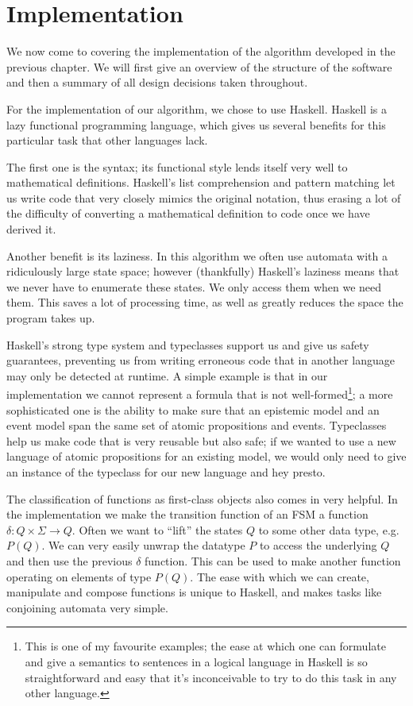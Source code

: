 \documentclass[10pt, a4paper]{report}
\begin{document}
\newpage 

\chapter{Implementation}

We now come to covering the implementation of the algorithm developed in the
previous chapter. We will first give an overview of the structure of the
software and then a summary of all design decisions taken throughout. 

For the implementation of our algorithm, we chose to use Haskell. Haskell is a
lazy functional programming language, which gives us several benefits for this
particular task that other languages lack. 

The first one is the syntax; its functional style lends itself very well to
mathematical definitions. Haskell's list comprehension and pattern matching let us
write code that very closely mimics the original notation, thus erasing a lot of
the difficulty of converting a mathematical definition to code once we have
derived it. 

Another benefit is its laziness. In this algorithm we often use automata
with a ridiculously large state space; however (thankfully) Haskell's laziness
means that we never have to enumerate these states. We only access them when we
need them. This saves a lot of processing time, as well as greatly reduces the
space the program takes up.

Haskell's strong type system and typeclasses support us and give us safety
guarantees, preventing us from writing erroneous code that in another language
may only be detected at runtime. A simple example is that in our implementation
we cannot represent a formula that is not well-formed\footnote{This is one of my
  favourite examples; the ease at which one can formulate and give a semantics
  to sentences in a logical language in Haskell is so straightforward and easy
  that it's inconceivable to try to do this task in any other language.}; a more
sophisticated one is the ability to make sure that an epistemic model and an
event model span the same set of atomic propositions and events. Typeclasses
help us make code that is very reusable but also safe; if we wanted to use a new
language of atomic propositions for an existing model, we would only need to
give an instance of the  typeclass for our new language and hey
presto.

The classification of functions as first-class objects also comes in very
helpful. In the implementation we make the transition function of an FSM a
function $\delta : Q \times \Sigma \rightarrow Q$. Often we want to ``lift'' the
states $Q$ to some other data type, e.g. $P (Q)$. We can very easily unwrap the
datatype $P$ to access the underlying $Q$ and then use the previous $\delta$
function. This can be used to make another function operating on elements of
type $P (Q)$. The ease with which we can create, manipulate and compose
functions is unique to Haskell, and makes tasks like conjoining automata very
simple. 
\end{document}

